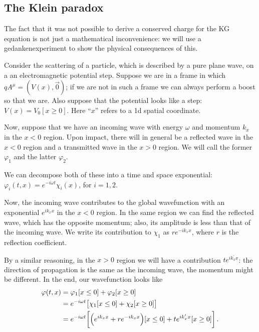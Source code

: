 \documentclass[main.tex]{subfiles}
\begin{document}
\subsection{The Klein paradox}


The fact that it was not possible to derive a conserved charge for the KG equation is not just a mathematical inconvenience: we will use a gedankenexperiment to show the physical consequences of this. 

Consider the scattering of a particle, which is described by a pure plane wave, on a an electromagnetic potential step.
Suppose we are in a frame in which \(qA^{\mu } = (V(x), \vec{0})\); if we are not in such a frame we can always perform a boost so that we are.
Also suppose that the potential looks like a step: \(V(x) = V_0 [x \geq 0]\). Here ``\(x\)'' refers to a 1d spatial coordinate. 

Now, suppose that we have an incoming wave with energy \(\omega \) and momentum \(k_{x}\) in the \(x<0\) region. 
Upon impact, there will in general be a reflected wave in the \(x<0\) region and a transmitted wave in the \(x>0\) region. We will call the former \(\varphi_{1}\) and the latter \(\varphi_{2}\). 

We can decompose both of these into a time and space exponential: \(\varphi_{i} (t, x) = e^{-i \omega t} \chi_{i}(x)\), for \(i = 1, 2\). 

Now, the incoming wave contributes to the global wavefunction with an exponential \(e^{ik_x x}\) in the \(x<0\) region. 
In the same region we can find the reflected wave, which has the opposite momentum; also, its amplitude is less than that of the incoming wave. We write its contribution to \(\chi_{1}\) as \(r e^{-i k_x x}\), where \(r\) is the reflection coefficient. 

By a similar reasoning, in the \(x>0\) region we will have a contribution \(t e^{i k_x^{\prime } x}\): the direction of propagation is the same as the incoming wave, the momentum might be different. In the end, our wavefunction looks like 
%
\begin{subequations}
\begin{align}
\varphi (t, x) &= \varphi_1 [x\leq 0] + \varphi_2 [x \geq 0] \\
&= e^{-i \omega t} \qty[\chi_1 [x\leq 0] + \chi_2 [x \geq 0]] \\
&=
 e^{-i \omega t} \qty[ \qty(e^{i k_x x} + r e^{-i k_x x})[x\leq 0] + t e^{i k_x^{\prime }x } [x\geq 0]]
\,.
\end{align}
\end{subequations}
\end{document}
